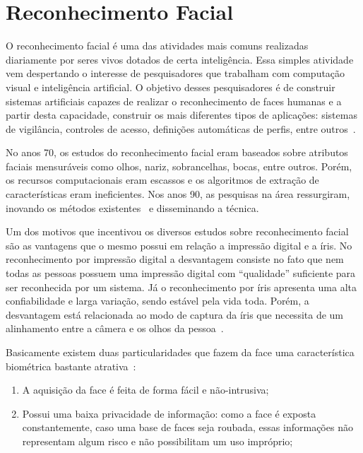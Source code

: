 \section{Reconhecimento Facial}

O reconhecimento facial é uma das atividades mais comuns realizadas diariamente por seres vivos dotados de certa inteligência. Essa simples atividade vem despertando o interesse de pesquisadores que trabalham com computação visual e inteligência artificial. O objetivo desses pesquisadores é de construir sistemas artificiais capazes de realizar o reconhecimento de faces humanas e a partir desta capacidade, construir os mais diferentes tipos de aplicações: sistemas de vigilância, controles de acesso, definições automáticas de perfis, entre outros~\cite{oliveira}.

No anos 70, os estudos do reconhecimento facial eram baseados sobre atributos faciais mensuráveis como olhos, nariz, sobrancelhas, bocas, entre outros. Porém, os recursos computacionais eram escassos e os algoritmos de extração de características eram ineficientes. Nos anos 90, as pesquisas na área ressurgiram, inovando os métodos existentes~\cite{hong, saocarlos} e disseminando a técnica.

Um dos motivos que incentivou os diversos estudos sobre reconhecimento facial são as vantagens que o mesmo possui em relação a impressão digital e a íris.  No reconhecimento por impressão digital a desvantagem consiste no fato que nem todas as pessoas possuem uma impressão digital com ``qualidade'' suficiente para ser reconhecida por um sistema. Já o reconhecimento por íris apresenta uma alta confiabilidade e larga variação, sendo estável pela vida toda. Porém, a desvantagem está relacionada ao modo de captura da íris que necessita de um alinhamento entre a câmera e os olhos da pessoa~\cite{saocarlos}. 

Basicamente existem duas particularidades que fazem da face uma característica biométrica bastante atrativa~\cite{drovetto}:

	\begin{enumerate}
		\item A aquisição da face é feita de forma fácil e não-intrusiva;
		\item Possui uma baixa privacidade de informação: como a face é exposta constantemente, caso uma base de faces seja roubada, essas informações não representam algum risco e não possibilitam um uso impróprio;
	\end{enumerate}

